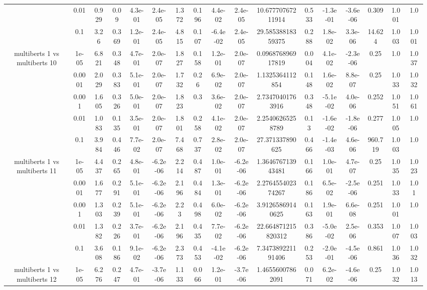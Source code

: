 \begin{tabular}{|c|c|c|c|c|c|c|c|c|c|c|c|c|c|c|c|c|}
 & 0.01 & 0.929 & 0.09 & 4.3e-01 & 2.4e-05 & 1.372 & 0.196 & 4.4e-02 & 2.4e-05 & 10.67770767211914 & 0.533 & -1.3e-01 & -3.6e-06 & 0.309 & 1.001 & 1.0 \\
 & 0.1 & 3.26 & 0.369 & 1.2e-01 & 2.4e-05 & 4.815 & 0.107 & -6.4e-02 & 2.4e-05 & 29.58538818359375 & 0.288 & 1.8e-02 & 3.3e-06 & 14.624 & 1.003 & 1.001 \\
\hline
\multirow{5}{*}{multiberts 1 vs multiberts 10} & 1e-05 & 6.821 & 0.348 & 4.7e-01 & 2.0e-07 & 1.827 & 0.158 & 1.2e-01 & 2.0e-07 & 0.096876896917819 & 0.004 & 4.1e-02 & -2.3e-06 & 0.25 & 1.0 & 1.037 \\
 & 0.0001 & 2.029 & 0.383 & 5.1e-01 & 2.0e-07 & 1.732 & 0.26 & 6.9e-02 & 2.0e-07 & 1.1325364112854 & 0.148 & 1.6e-02 & 8.8e-07 & 0.25 & 1.033 & 1.032 \\
 & 0.001 & 1.605 & 0.326 & 5.0e-01 & 2.0e-07 & 1.823 & 0.3 & 3.6e-02 & 2.0e-07 & 2.73470401763916 & 0.348 & -5.1e-02 & 4.0e-06 & 0.252 & 1.051 & 1.061 \\
 & 0.01 & 1.083 & 0.135 & 3.5e-01 & 2.0e-07 & 1.801 & 0.258 & 4.1e-02 & 2.0e-07 & 2.25406265258789 & 0.13 & -1.6e-02 & -1.8e-06 & 0.277 & 1.005 & 1.0 \\
 & 0.1 & 3.984 & 0.446 & 7.7e-02 & 2.0e-07 & 7.468 & 0.737 & 2.8e-02 & 2.0e-07 & 27.371337890625 & 0.466 & -1.4e-03 & 4.6e-06 & 960.719 & 1.003 & 1.0 \\
\hline
\multirow{5}{*}{multiberts 1 vs multiberts 11} & 1e-05 & 4.437 & 0.265 & 4.8e-01 & -6.2e-06 & 2.214 & 0.487 & 1.0e-01 & -6.2e-06 & 1.364676713943481 & 0.166 & 1.0e-01 & 4.7e-07 & 0.25 & 1.035 & 1.023 \\
 & 0.0001 & 1.677 & 0.291 & 5.1e-01 & -6.2e-06 & 2.196 & 0.484 & 1.3e-01 & -6.2e-06 & 2.276455402374267 & 0.186 & 6.5e-02 & -2.5e-06 & 0.251 & 1.033 & 1.01 \\
 & 0.001 & 1.303 & 0.239 & 5.1e-01 & -6.2e-06 & 2.23 & 0.498 & 6.0e-02 & -6.2e-06 & 3.91265869140625 & 0.163 & 1.9e-01 & 6.6e-08 & 0.251 & 1.001 & 1.0 \\
 & 0.01 & 1.382 & 0.226 & 3.7e-01 & -6.2e-06 & 2.196 & 0.435 & 7.7e-02 & -6.2e-06 & 22.664871215820312 & 0.386 & -5.0e-02 & 2.5e-06 & 0.353 & 1.007 & 1.003 \\
 & 0.1 & 3.608 & 0.186 & 9.1e-02 & -6.2e-06 & 2.373 & 0.453 & -4.1e-02 & -6.2e-06 & 7.347389221191406 & 0.253 & -2.0e-01 & -4.5e-06 & 0.861 & 1.036 & 1.032 \\
\hline
\multirow{5}{*}{multiberts 1 vs multiberts 12} & 1e-05 & 6.276 & 0.247 & 4.7e-01 & -3.7e-06 & 1.133 & 0.066 & 1.2e-01 & -3.7e-06 & 1.46556007862091 & 0.071 & 6.2e-02 & -4.6e-06 & 0.25 & 1.032 & 1.013 \\

\end{tabular}
